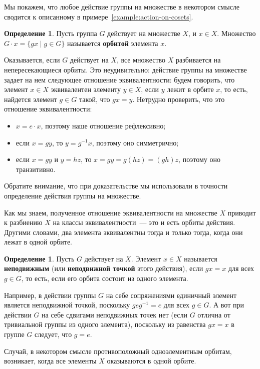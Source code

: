 \documentclass[a4paper,11pt]{scrartcl}
\theoremstyle{plain}
\theoremstyle{definition}
\newtheorem{definition}[theorem]{Определение}
\newcommand\dfn[1]{\textbf{#1}}
\begin{document}
Мы покажем, что любое действие группы на множестве в некотором смысле
сводится к описанному в примере~\ref{example:action-on-cosets}.

\begin{definition}
Пусть группа $G$ действует на множестве $X$, и $x\in X$.
Множество
$G\cdot x = \{gx\mid g\in G\}$ называется \dfn{орбитой} элемента $x$.
\end{definition}

Оказывается, если $G$ действует на $X$, все множество $X$ разбивается
на непересекающиеся орбиты.
Это неудивительно: действие группы на множестве задает на нем
следующее отношение эквивалентности: будем говорить,
что элемент $x\in X$ эквивалентен элементу $y\in X$,
если $y$ лежит в орбите $x$, то есть, найдется элемент
$g\in G$ такой, что $gx = y$.
Нетрудно проверить, что это отношение эквивалентности:
\begin{itemize}
\item $x = e\cdot x$, поэтому наше отношение рефлексивно;
\item если $x = gy$, то $y = g^{-1}x$, поэтому оно симметрично;
\item если $x = gy$ и $y = hz$, то $x = gy = g(hz) = (gh)z$,
поэтому оно транзитивно.
\end{itemize}
Обратите внимание, что при доказательстве мы использовали в точности
определение действия группы на множестве.

Как мы знаем, полученное отношение эквивалентности на множестве $X$
приводит к разбиению $X$ на классы эквивалентности~--- это и есть орбиты
действия.
Другими словами, два элемента эквивалентны тогда и только тогда, когда
они лежат в одной орбите.

\begin{definition}
Пусть $G$ действует на $X$.
Элемент $x\in X$ называется \dfn{неподвижным} (или \dfn{неподвижной точкой}
этого действия), если $gx = x$ для всех $g\in G$, то есть, если его орбита
состоит из одного элемента.
\end{definition}

Например, в действии группы $G$ на себе сопряжениями единичный элемент
является неподвижной точкой, поскольку $geg^{-1} = e$ для всех $g\in G$.
А вот при действии $G$ на себе сдвигами неподвижных точек нет (если $G$
отлична от тривиальной группы из одного элемента), поскольку
из равенства $gx = x$ в группе $G$ следует, что $g = e$.

Случай, в некотором смысле противоположный одноэлементным орбитам,
возникает, когда все элементы $X$ оказываются в одной орбите.
\end{document}
